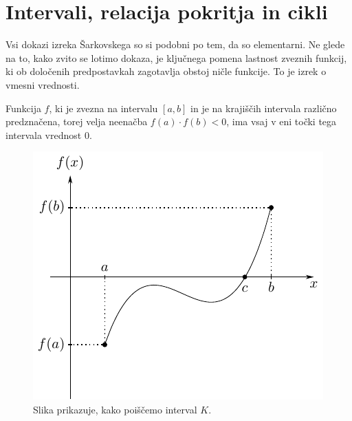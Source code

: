 \documentclass[mat2]{fmfdelo}
\begin{document}
\section{Intervali, relacija pokritja in cikli}%
Vsi dokazi izreka Šarkovskega so si podobni po tem, da so elementarni. Ne glede na to, kako zvito se lotimo dokaza, je ključnega pomena lastnost zveznih funkcij, ki ob določenih predpostavkah zagotavlja obstoj ničle funkcije. To je izrek o vmesni vrednosti.

\begin{izrek}\label{izr:iovv}
Funkcija $f$, ki je zvezna na intervalu $[a, b]$ in je na krajiščih intervala različno predznačena, torej velja neenačba $f(a)\cdot f(b) < 0$, ima vsaj v eni točki tega intervala vrednost 0.
\end{izrek}

\begin{figure}[h]
  \centering
  \includegraphics[]{images/intermediate.pdf}
  \caption[Primer vektorske slike.]{Slika prikazuje, kako poiščemo interval $K$.}
  \label{fig:bezje}
\end{figure}
\end{document}
